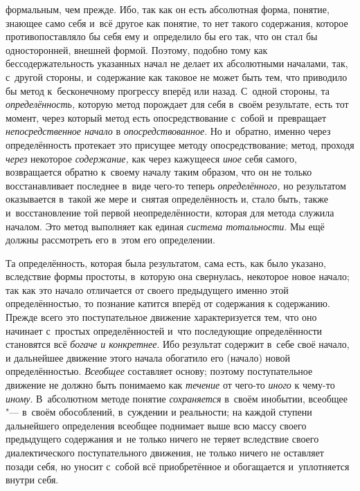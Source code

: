 формальным, чем прежде. Ибо, так как он есть абсолютная форма, понятие,
знающее само себя и~всё другое как понятие, то нет такого содержания,
которое противопоставляло бы себя ему и~определило бы его так, что он стал
бы односторонней, внешней формой. Поэтому, подобно тому как
бессодержательность указанных начал не делает их абсолютными началами, так,
с~другой стороны, и~содержание как таковое не может быть
тем, что приводило бы метод к~бесконечному прогрессу вперёд или назад.
С~одной стороны, та {\em определённость,}
которую метод порождает для себя в~своём результате, есть тот
момент, через который метод есть опосредствование с~собой и~превращает
{\em непосредственное начало} в {\em опосредствованное}.
Но и~обратно, именно через определённость протекает это
присущее методу опосредствование; метод, проходя
{\em через} некоторое {\em содержание,} как через кажущееся {\em иное}
себя самого, возвращается обратно к~своему началу таким
образом, что он не только восстанавливает последнее в~виде чего-то теперь
{\em определённого,} но
результатом оказывается в~такой же мере и~снятая определённость и, стало
быть, также и~восстановление той первой неопределённости, которая для
метода служила началом. Это метод выполняет как единая
{\em система тотальности}.
Мы ещё должны рассмотреть его в~этом его определении.

Та определённость, которая была результатом, сама есть, как
было указано, вследствие формы простоты, в~которую она свернулась,
некоторое новое начало; так как это начало отличается от своего предыдущего
именно этой определённостью, то познание катится вперёд от содержания к
содержанию. Прежде всего это поступательное движение характеризуется тем,
что оно начинает с~простых определённостей и~что последующие определённости
становятся всё {\em богаче и
конкретнее}. Ибо результат содержит в~себе своё начало, и
дальнейшее движение этого начала обогатило его (начало) новой
определённостью. {\em Всеобщее}
составляет основу; поэтому поступательное движение не должно
быть понимаемо как {\em течение} от чего-то {\em иного} к
чему-то {\em иному}. В~абсолютном методе понятие {\em сохраняется} в~своём
инобытии, всеобщее "--- в~своём обособлений, в~суждении и
реальности; на каждой ступени дальнейшего определения всеобщее поднимает
выше всю массу своего предыдущего содержания и~не только ничего не теряет
вследствие своего диалектического поступательного движения, не только
ничего не оставляет позади себя, но уносит с~собой всё приобретённое и
обогащается и~уплотняется внутри себя.

